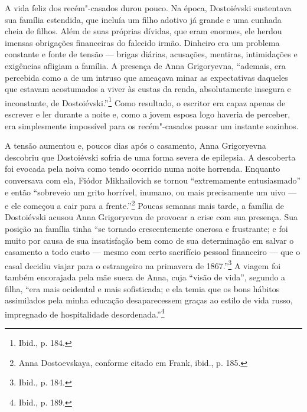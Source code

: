 A vida feliz dos recém"-casados durou pouco. Na época, Dostoiévski
sustentava sua família estendida, que incluía um filho adotivo já grande
e uma cunhada cheia de filhos. Além de suas próprias dívidas, que eram
enormes, ele herdou imensas obrigações financeiras do falecido irmão.
Dinheiro era um problema constante e fonte de tensão --- brigas diárias,
acusações, mentiras, intimidações e exigências afligiam a família. A
presença de Anna Grigoryevna, ``ademais, era percebida como a de um
intruso que ameaçava minar as expectativas daqueles que estavam
acostumados a viver às custas da renda, absolutamente insegura e
inconstante, de Dostoiévski.''\footnote{Ibid., p. 184.} Como resultado,
o escritor era capaz apenas de escrever e ler durante a noite e, como a
jovem esposa logo haveria de perceber, era simplesmente impossível para
os recém"-casados passar um instante sozinhos.

A tensão aumentou e, poucos dias após o casamento, Anna Grigoryevna
descobriu que Dostoiévski sofria de uma forma severa de epilepsia. A
descoberta foi evocada pela noiva como tendo ocorrido numa noite
horrenda. Enquanto conversava com ela, Fiódor Mikhailovich se tornou
``extremamente entusiasmado'' e então ``sobreveio um grito horrível,
inumano, ou mais precisamente um uivo --- e ele começou a cair para a
frente.''\footnote{Anna Dostoevskaya, conforme citado em Frank, ibid.,
  p. 185.} Poucas semanas mais tarde, a família de Dostoiévski acusou
Anna Grigoryevna de provocar a crise com sua presença. Sua posição na
família tinha ``se tornado crescentemente onerosa e frustrante; e foi
muito por causa de sua insatisfação bem como de sua determinação em
salvar o casamento a todo custo --- mesmo com certo sacrifício pessoal
financeiro --- que o casal decidiu viajar para o estrangeiro na primavera
de 1867.''\footnote{Ibid., p. 184.} A viagem foi também encorajada pela
mãe sueca de Anna, cuja ``visão de vida'', segundo a filha, ``era mais
ocidental e mais sofisticada; e ela temia que os bons hábitos
assimilados pela minha educação desaparecessem graças ao estilo de vida
russo, impregnado de hospitalidade desordenada.''\footnote{Ibid., p.
  189.}

